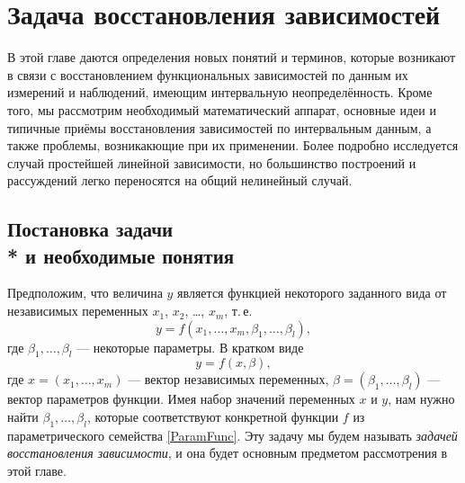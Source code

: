\documentclass[a5paper,openany]{book}
\begin{document}
  
  
\chapter{Задача восстановления зависимостей} 
\label{FuncFitChap}
  
  
В этой главе даются определения новых понятий и терминов, которые возникают в связи 
с восстановлением функциональных зависимостей по данным их измерений и наблюдений, 
имеющим интервальную неопределённость. Кроме того, мы рассмотрим необходимый 
математический аппарат, основные идеи и типичные приёмы восстановления зависимостей 
по интервальным данным, а также проблемы, возникакющие при их применении. Более 
подробно исследуется случай простейшей линейной зависимости, но большинство 
построений и рассуждений легко переносятся на общий нелинейный случай. 
  
  
\section[Постановка задачи и необходимые понятия]%
        {Постановка задачи \\* и необходимые понятия} 
  
Предположим, что величина $y$ является функцией некоторого заданного вида от 
независимых переменных $x_1$, $x_2$, \ldots, $x_m$, т.\,е. 
\begin{equation}
\label{ParamFunc} 
y = f(x_{1}, \ldots, x_{m}, \beta_1, \ldots, \beta_l), 
\end{equation} 
где $\beta_1, \ldots, \beta_l$ --- некоторые параметры. В кратком виде  
\begin{equation*}
y = f(x, \beta), 
\end{equation*} 
где $x = (x_{1}, \ldots, x_{m})$ --- вектор независимых переменных, $\beta = (\beta_1, 
\ldots, \beta_l)$ --- вектор параметров функции. Имея набор значений переменных $x$ 
и $y$, нам нужно найти $\beta_1, \ldots, \beta_l$, которые соответствуют конкретной 
функции $f$ из параметрического семейства \eqref{ParamFunc}. Эту задачу мы будем 
называть \emph{задачей восстановления зависимости}, и она будет основным предметом 
рассмотрения в этой главе.                 
  
\end{document}
